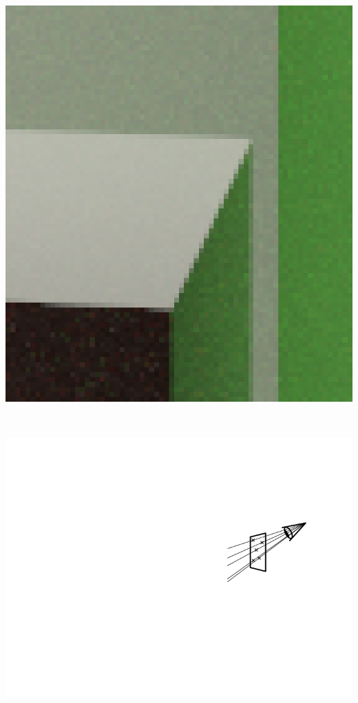 \documentclass[utf8,stillsansserifmath,fleqn,t]{beamer}
\begin{document}
\begin{frame}
\begin{minipage}{.21\textwidth}
\includegraphics[width=\textwidth]{./fig/cornellbox-antialiasing-on-cutout.png}
\end{minipage}~~~~
\begin{minipage}{.3\textwidth}
\includegraphics[width=\textwidth]{./fig/antialiasing-2.pdf}
\end{minipage}\\
\end{frame}
\end{document}
